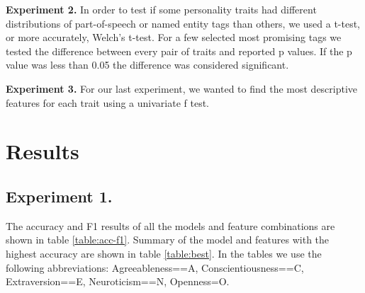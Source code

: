 \documentclass[10pt, a4paper]{article}
\begin{document}
\textbf{Experiment 2.}  In order to test if some personality traits had different distributions of part-of-speech or named entity tags than others, we used a t-test, or more accurately, Welch's t-test.
For a few selected most promising tags we tested the difference between every pair of traits and reported p values.
If the p value was less than 0.05 the difference was considered significant.

\textbf{Experiment 3.} For our last experiment, we wanted to find the most descriptive features for each trait using a univariate f test.

\section{Results}

\subsection{Experiment 1.}
The accuracy and F1 results of all the models and feature combinations are shown in table \ref{table:acc-f1}.
Summary of the model and features with the highest accuracy are shown in table \ref{table:best}.
In the tables we use the following abbreviations: Agreeableness==A, Conscientiousness==C, Extraversion==E, Neuroticism==N, Openness=O.
\end{document}
